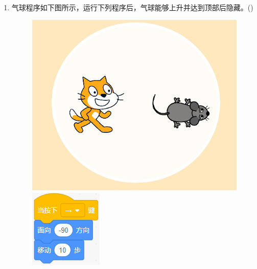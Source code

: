 \documentclass[10pt, a4paper]{article}
\newcommand{\hq}{\hfill(\qquad)}
\begin{document}
\begin{enumerate}
        \item 气球程序如下图所示，运行下列程序后，气球能够上升并达到顶部后隐藏。\hq
        
        \begin{figure}[htbp]
            \centering
            \begin{minipage}[t]{.4\textwidth}
                \centering
                \begin{minipage}[t]{.5\textwidth}
                    \centering
                    \includegraphics[width=\textwidth]{figure/32-1.png}
                \end{minipage}
                \begin{minipage}[t]{.45\textwidth}
                    \centering
                    \includegraphics[width=\textwidth]{figure/32-2.png}

\end{minipage}
\end{minipage}
\end{figure}
\end{enumerate}
\end{document}
